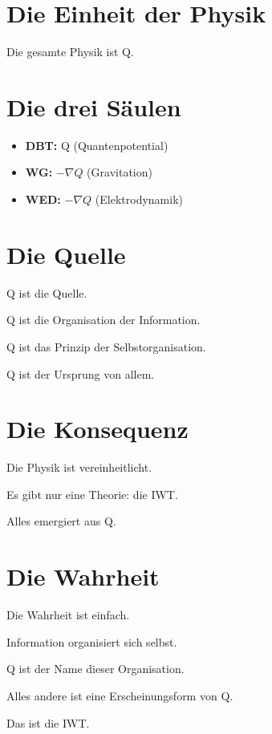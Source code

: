 
\section{Die Einheit der Physik}

Die gesamte Physik ist Q.

\section{Die drei Säulen}

\begin{itemize}
    \item \textbf{DBT:} Q (Quantenpotential)
    \item \textbf{WG:} \( -\nabla Q \) (Gravitation)
    \item \textbf{WED:} \( -\nabla Q \) (Elektrodynamik)
\end{itemize}

\section{Die Quelle}

Q ist die Quelle.

Q ist die Organisation der Information.

Q ist das Prinzip der Selbstorganisation.

Q ist der Ursprung von allem.

\section{Die Konsequenz}

Die Physik ist vereinheitlicht.

Es gibt nur eine Theorie: die IWT.

Alles emergiert aus Q.

\section{Die Wahrheit}

Die Wahrheit ist einfach.

Information organisiert sich selbst.

Q ist der Name dieser Organisation.

Alles andere ist eine Erscheinungsform von Q.

Das ist die IWT.